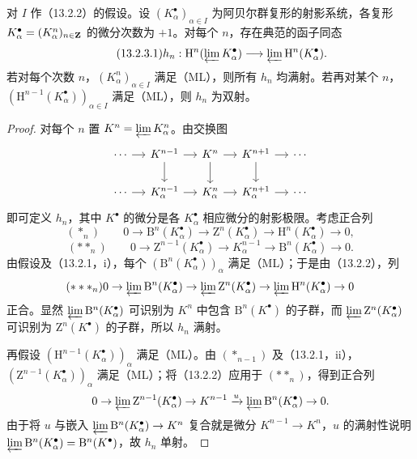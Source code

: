 对 $I$ 作（13.2.2）的假设。设 $(K_\alpha^\bullet)_{\alpha\in I}$ 为阿贝尔群复形的射影系统，各复形 $K_\alpha^\bullet=(K_\alpha^n)_{n\in\mathbf Z}$ 的微分次数为 $+1$。对每个 $n$，存在典范的函子同态
\begin{equation}\tag{13.2.3.1}
h_n:\mathrm H^n(\varprojlim K_\alpha^\bullet)\longrightarrow\varprojlim\mathrm H^n(K_\alpha^\bullet).
\end{equation}
若对每个次数 $n$，$(K_\alpha^n)_{\alpha\in I}$ 满足（ML），则所有 $h_n$ 均满射。若再对某个 $n$，$(\mathrm H^{n-1}(K_\alpha^\bullet))_{\alpha\in I}$ 满足（ML），则 $h_n$ 为双射。
\begin{proof}
对每个 $n$ 置 $K^n=\varprojlim K_\alpha^n$。由交换图
\[
\begin{tikzcd}[column sep=small]
\cdots\arrow[r]&K^{n-1}\arrow[r]\arrow[d]&K^n\arrow[r]\arrow[d]&K^{n+1}\arrow[r]\arrow[d]&\cdots\\
\cdots\arrow[r]&K_\alpha^{n-1}\arrow[r]&K_\alpha^n\arrow[r]&K_\alpha^{n+1}\arrow[r]&\cdots
\end{tikzcd}
\]
即可定义 $h_n$，其中 $K^\bullet$ 的微分是各 $K_\alpha^\bullet$ 相应微分的射影极限。考虑正合列
\[
(*_n)\qquad0\to\mathrm B^n(K_\alpha^\bullet)\to\mathrm Z^n(K_\alpha^\bullet)
\to\mathrm H^n(K_\alpha^\bullet)\to0,
\]
\[
(**_n)\qquad0\to\mathrm Z^{n-1}(K_\alpha^\bullet)\to K_\alpha^{n-1}
\to\mathrm B^n(K_\alpha^\bullet)\to0.
\]
由假设及（13.2.1，i），每个 $(\mathrm B^n(K_\alpha^\bullet))_\alpha$ 满足（ML）；于是由（13.2.2），列
\[
(***_n)0\to\varprojlim\mathrm B^n(K_\alpha^\bullet)
\to\varprojlim\mathrm Z^n(K_\alpha^\bullet)
\to\varprojlim\mathrm H^n(K_\alpha^\bullet)\to0
\]
正合。显然 $\varprojlim\mathrm B^n(K_\alpha^\bullet)$ 可识别为 $K^n$ 中包含 $\mathrm B^n(K^\bullet)$ 的子群，而 $\varprojlim\mathrm Z^n(K_\alpha^\bullet)$ 可识别为 $\mathrm Z^n(K^\bullet)$ 的子群，所以 $h_n$ 满射。

再假设 $(\mathrm H^{n-1}(K_\alpha^\bullet))_\alpha$ 满足（ML）。由 $(*_{n-1})$ 及（13.2.1，ii），$(\mathrm Z^{n-1}(K_\alpha^\bullet))_\alpha$ 满足（ML）；将（13.2.2）应用于 $(**_n)$，得到正合列
\[
0\to\varprojlim\mathrm Z^{n-1}(K_\alpha^\bullet)\to K^{n-1}
\xrightarrow{u}\varprojlim\mathrm B^n(K_\alpha^\bullet)\to0.
\]
由于将 $u$ 与嵌入 $\varprojlim\mathrm B^n(K_\alpha^\bullet)\to K^n$ 复合就是微分 $K^{n-1}\to K^n$，$u$ 的满射性说明 $\varprojlim\mathrm B^n(K_\alpha^\bullet)=\mathrm B^n(K^\bullet)$，故 $h_n$ 单射。
\end{proof}

